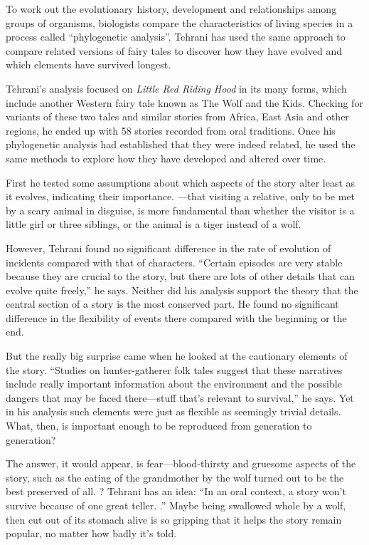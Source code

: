\documentclass{exam-zh}
\begin{document}
To work out the evolutionary history, development and relationships among groups of organisms, biologists compare the characteristics of living species in a process called ``phylogenetic analysis''. Tehrani has used the same approach to compare related versions of fairy tales to discover how they have evolved and which elements have survived longest.

Tehrani's analysis focused on \textit{Little Red Riding Hood} in its many forms, which include another Western fairy tale known as The Wolf and the Kids. Checking for variants of these two tales and similar stories from Africa, East Asia and other regions, he ended up with 58 stories recorded from oral traditions. Once his phylogenetic analysis had established that they were indeed related, he used the same methods to explore how they have developed and altered over time.

First he tested some assumptions about which aspects of the story alter least as it evolves, indicating their importance. \fillin[D]—that visiting a relative, only to be met by a scary animal in disguise, is more fundamental than whether the visitor is a little girl or three siblings, or the animal is a tiger instead of a wolf.

However, Tehrani found no significant difference in the rate of evolution of incidents compared with that of characters. ``Certain episodes are very stable because they are crucial to the story, but there are lots of other details that can evolve quite freely,'' he says. Neither did his analysis support the theory that the central section of a story is the most conserved part. He found no significant difference in the flexibility of events there compared with the beginning or the end.

But the really big surprise came when he looked at the cautionary elements of the story. ``Studies on hunter-gatherer folk tales suggest that these narratives include really important information about the environment and the possible dangers that may be faced there—stuff that's relevant to survival,'' he says. Yet in his analysis such elements were just as flexible as seemingly trivial details. What, then, is important enough to be reproduced from generation to generation?

The answer, it would appear, is fear—blood-thirsty and gruesome aspects of the story, such as the eating of the grandmother by the wolf turned out to be the best preserved of all. \fillin[B]? Tehrani has an idea: ``In an oral context, a story won't survive because of one great teller. \fillin[C].'' Maybe being swallowed whole by a wolf, then cut out of its stomach alive is so gripping that it helps the story remain popular, no matter how badly it's told.
\end{document}
